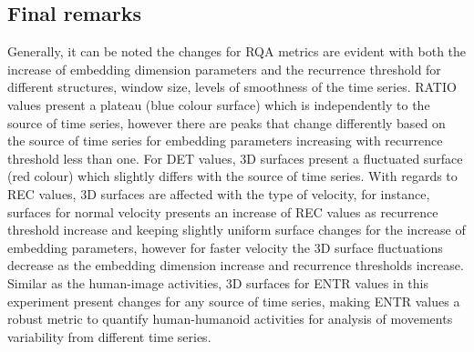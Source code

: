 \subsection{Final remarks}
Generally, it can be noted the changes for RQA metrics are evident
with both the increase of embedding dimension parameters and the 
recurrence threshold for different structures, window size, 
levels of smoothness of the time series. 
RATIO values present a plateau (blue colour surface) which is independently 
to the source of time series, however there are peaks that change 
differently based on the source of time series for embedding parameters 
increasing with recurrence threshold less than one.
For DET values, 3D surfaces present a fluctuated surface (red colour)
which slightly differs with the source of time series.
With regards to REC values, 3D surfaces are affected with the type of 
velocity, for instance, surfaces for normal velocity presents 
an increase of REC values as recurrence threshold increase and keeping 
slightly uniform surface changes for the increase of embedding parameters, 
however for faster velocity the 3D surface fluctuations decrease as 
the embedding dimension increase and recurrence thresholds increase.
Similar as the human-image activities, 3D surfaces for ENTR values in 
this experiment present changes for any source of time series,
making ENTR values a robust metric to quantify human-humanoid activities 
for analysis of movements variability from different time series.








